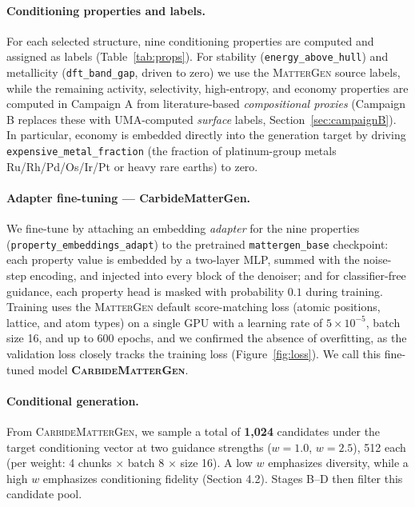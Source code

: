 \documentclass[11pt,a4paper]{report}
\begin{document}
\paragraph{Conditioning properties and labels.} For each selected structure, nine conditioning properties are computed and assigned as labels
(Table~\ref{tab:props}). For stability (\texttt{energy\_above\_hull}) and metallicity (\texttt{dft\_band\_gap}, driven to zero) we use the
\textsc{MatterGen} source labels, while the remaining activity, selectivity, high-entropy, and economy properties are computed in Campaign A from literature-based
\emph{compositional proxies} (Campaign B replaces these with UMA-computed \emph{surface} labels,
Section~\ref{sec:campaignB}). In particular, economy is embedded directly into the generation target by driving \texttt{expensive\_metal\_fraction} (the fraction of platinum-group metals Ru/Rh/Pd/Os/Ir/Pt
or heavy rare earths) to zero.

\paragraph{Adapter fine-tuning --- CarbideMatterGen.} We fine-tune by attaching an embedding \emph{adapter} for the nine
properties (\texttt{property\_embeddings\_adapt}) to the pretrained \texttt{mattergen\_base} checkpoint: each property value is embedded by a
two-layer MLP, summed with the noise-step encoding, and injected into every block of the denoiser; and for classifier-free
guidance, each property head is masked with probability $0.1$ during training. Training uses the \textsc{MatterGen} default score-matching
loss (atomic positions, lattice, and atom types) on a single GPU with a learning rate of
$5\times10^{-5}$, batch size 16, and up to 600 epochs, and we confirmed the absence of overfitting, as the validation loss closely tracks the training loss
(Figure~\ref{fig:loss}). We call this fine-tuned model \textbf{\textsc{CarbideMatterGen}}.

\paragraph{Conditional generation.} From \textsc{CarbideMatterGen}, we sample a total of \textbf{1{,}024} candidates under the target conditioning vector at two guidance strengths
($w=1.0$, $w=2.5$), 512 each (per weight: 4 chunks $\times$
batch 8 $\times$ size 16). A low $w$ emphasizes diversity, while a high $w$ emphasizes conditioning fidelity (Section 4.2).
Stages B--D then filter this candidate pool.
\end{document}
